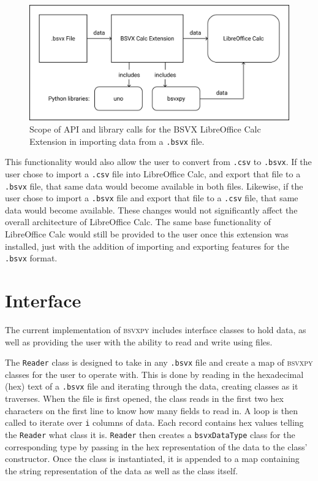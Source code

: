\documentclass[10pt]{article}
\begin{document}
\begin{figure}[H]
\centering
\includegraphics[width=5in]{figures/bsvxToData.png}
\caption{Scope of API and library calls for the BSVX LibreOffice Calc Extension in importing data from a \texttt{.bsvx} file.}
\label{fig:deliverables_bsvxToData}
\end{figure}

\indent{}
This functionality would also allow the user to convert from \texttt{.csv} to \texttt{.bsvx}.
If the user chose to import a \texttt{.csv} file into LibreOffice Calc, and export that file to a \texttt{.bsvx} file, that same data would become available in both files.
Likewise, if the user chose to import a \texttt{.bsvx} file and export that file to a \texttt{.csv} file, that same data would become available.
These changes would not significantly affect the overall architecture of LibreOffice Calc.
The same base functionality of LibreOffice Calc would still be provided to the user once this extension was installed, just with the addition of importing and exporting features for the \texttt{.bsvx} format.

\section*{Interface}
The current implementation of \textsc{bsvxpy} includes interface classes to hold data, as well as providing the user with the ability to read and write using files.

\indent{}
The \texttt{Reader} class is designed to take in any \texttt{.bsvx} file and create a map of \textsc{bsvxpy} classes for the user to operate with.
This is done by reading in the hexadecimal (hex) text of a \texttt{.bsvx} file and iterating through the data, creating classes as it traverses.
When the file is first opened, the class reads in the first two hex characters on the first line to know how many fields to read in.
A loop is then called to iterate over \texttt{i} columns of data.
Each record contains hex values telling the \texttt{Reader} what class it is.
\texttt{Reader} then creates a \texttt{bsvxDataType} class for the corresponding type by passing in the hex representation of the data to the class’ constructor.
Once the class is instantiated, it is appended to a map containing the string representation of the data as well as the class itself.
\end{document}
